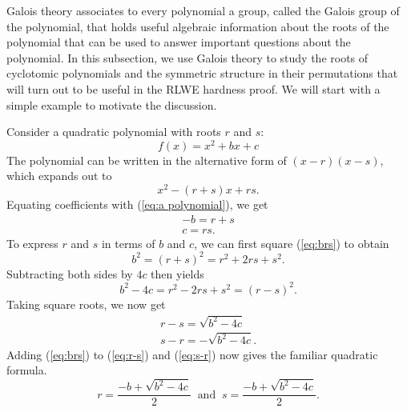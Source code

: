 \documentclass[../main.tex]{subfiles}
\begin{document}
 Galois theory associates to every polynomial a group, called the Galois group of the polynomial, that holds useful algebraic information about the roots of the polynomial that can be used to answer important questions about the polynomial. 
In this subsection, we use Galois theory to study the roots of cyclotomic polynomials and the symmetric structure in their permutations that will turn out to be useful in the RLWE hardness proof.
We will start with a simple example to motivate the discussion. 

\begin{example}\label{ex:quadratic formula}
Consider a quadratic polynomial with roots $r$ and $s$:
\begin{equation}
f(x) = x^2 + bx + c \label{eq:a polynomial}    
\end{equation}
The polynomial can be written in the alternative form of $(x-r)(x-s)$, which expands out to 
\[ x^2 - (r+s)x + rs. \] 
Equating coefficients with (\ref{eq:a polynomial}), we get
\begin{align}
-b = r + s \label{eq:brs} \\
c = rs. \label{eq:crs}
\end{align}
To express $r$ and $s$ in terms of $b$ and $c$, we can first square (\ref{eq:brs}) to obtain
\[ b^2 = (r+s)^2 = r^2 + 2rs + s^2. \]
Subtracting both sides by $4c$ then yields
\[ b^2 - 4c = r^2 -2rs + s^2 = (r - s)^2. \]
Taking square roots, we now get
\begin{align}
    r - s = \sqrt{b^2 - 4c} \label{eq:r-s}\\
    s - r = -\sqrt{b^2 - 4c}. \label{eq:s-r}
\end{align}
Adding (\ref{eq:brs}) to (\ref{eq:r-s}) and (\ref{eq:s-r}) now gives the familiar quadratic formula.
\[ r = \frac{-b + \sqrt{b^2 - 4c}}{2}  \;\;\text{and}\;\; s = \frac{-b + \sqrt{b^2 - 4c}}{2}. \]
\end{example}
\end{document}
